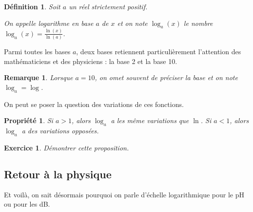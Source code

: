 \documentclass[11pt,a4paper,french]{article}
\theoremstyle{break}
\newtheorem{definition}{Définition}
\newtheorem{propriete}{Propriété}
\theoremstyle{plain}
\newtheorem{exerciceT}{Exercice}
\theoremstyle{nonumberplain}
\newtheorem{remarque}{Remarque}
\theoremstyle{nonumberbreak}
\newenvironment{exercice}{\begin{framed}\begin{exerciceT}}{\end{exerciceT}\end{framed}}
\begin{document}
\begin{definition}
  Soit $a$ un réel strictement positif.

  On appelle logarithme en base $a$ de $x$ et on note $\log_a(x)$ le
  nombre $\log_a(x) = \frac{\ln(x)}{\ln(a)}$.
\end{definition}

Parmi toutes les bases $a$, deux bases retiennent particulièrement
l'attention des mathématiciens et des physiciens : la base 2 et la base
10.

\begin{remarque}
  Lorsque $a = 10$, on omet souvent de préciser la base et on note
  $\log_a = \log$.
\end{remarque}

On peut se poser la question des variations de ces fonctions.

\begin{propriete}
  Si $a >1$, alors $\log_a$ a les même variations que $\ln$. Si $a<1$,
  alors $\log_a$ a des variations opposées.
\end{propriete}

\begin{exercice}
  Démontrer cette proposition.
\end{exercice}

\subsection{Retour à la physique}

Et voilà, on sait désormais pourquoi on parle d'échelle logarithmique
pour le pH ou pour les dB.
\end{document}
